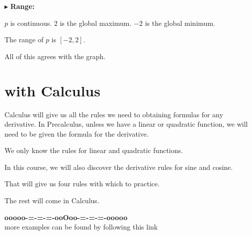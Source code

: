 \documentclass{ximera}
\begin{document}
$\blacktriangleright$ \textbf{\textcolor{blue!55!black}{Range:}}


$p$ is continuous. $2$ is the global maximum.  $-2$ is the global minimum.  


The range of $p$ is $[-2, 2]$. 






All of this agrees with the graph.















\section*{with Calculus}


Calculus will give us all the rules we need to obtaining formulas for any derivative.  In Precalculus, unless we have a linear or quadratic function, we will need to be given the formula for the derivative.


We only know the rules for linear and quadratic functions. 


In this course, we will also discover the derivative rules for sine and cosine. 

That will give us four rules with which to practice. 


The rest will come in Calculus. 











\begin{center}
\textbf{\textcolor{green!50!black}{ooooo-=-=-=-ooOoo-=-=-=-ooooo}} \\

more examples can be found by following this link\\ 

\end{center}
\end{document}
